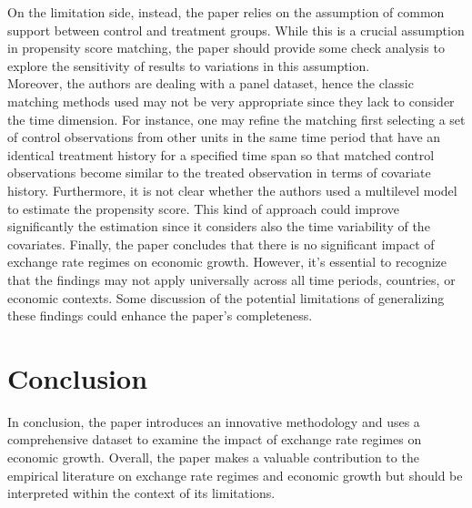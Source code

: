 \documentclass[
  12pt]{article}
\begin{document}
On the limitation side, instead, the paper relies on the assumption of
common support between control and treatment groups. While this is a
crucial assumption in propensity score matching, the paper should
provide some check analysis to explore the sensitivity of results to
variations in this assumption.\\
Moreover, the authors are dealing with a panel dataset, hence the
classic matching methods used may not be very appropriate since they
lack to consider the time dimension. For instance, one may refine the
matching first selecting a set of control observations from other units
in the same time period that have an identical treatment history for a
specified time span so that matched control observations become similar
to the treated observation in terms of covariate history. Furthermore,
it is not clear whether the authors used a multilevel model to estimate
the propensity score. This kind of approach could improve significantly
the estimation since it considers also the time variability of the
covariates. Finally, the paper concludes that there is no significant
impact of exchange rate regimes on economic growth. However, it's
essential to recognize that the findings may not apply universally
across all time periods, countries, or economic contexts. Some
discussion of the potential limitations of generalizing these findings
could enhance the paper's completeness.

\hypertarget{conclusion}{%
\section{Conclusion}\label{conclusion}}

In conclusion, the paper introduces an innovative methodology and uses a
comprehensive dataset to examine the impact of exchange rate regimes on
economic growth. Overall, the paper makes a valuable contribution to the
empirical literature on exchange rate regimes and economic growth but
should be interpreted within the context of its limitations.
\end{document}
